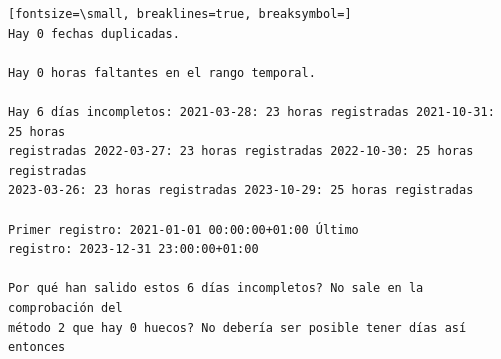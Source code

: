 \documentclass[12pt,a4paper,oneside]{book}
\begin{document}
\begin{iaprompt}
\begin{Verbatim}[fontsize=\small, breaklines=true, breaksymbol=]
Hay 0 fechas duplicadas.

Hay 0 horas faltantes en el rango temporal.

Hay 6 días incompletos: 2021-03-28: 23 horas registradas 2021-10-31: 25 horas
registradas 2022-03-27: 23 horas registradas 2022-10-30: 25 horas registradas
2023-03-26: 23 horas registradas 2023-10-29: 25 horas registradas

Primer registro: 2021-01-01 00:00:00+01:00 Último
registro: 2023-12-31 23:00:00+01:00

Por qué han salido estos 6 días incompletos? No sale en la comprobación del
método 2 que hay 0 huecos? No debería ser posible tener días así entonces

\end{Verbatim}
\end{iaprompt}
\end{document}
